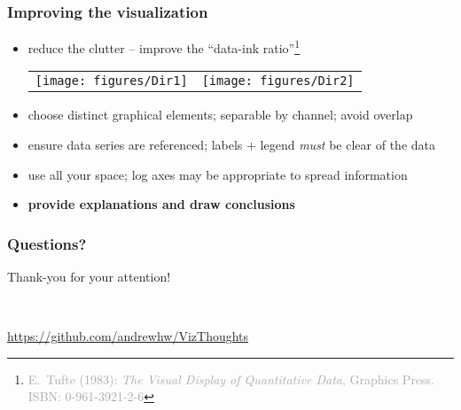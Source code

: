 \documentclass{beamer}
\newcommand{\eg}{\textit{e.g.},\xspace} %
\newcommand{\key}[1]{\textcolor{keyred}{{\bf #1}}}
\begin{document}
\begin{frame}
\frametitle{Improving the visualization}
\begin{itemize}
\item reduce the clutter -- improve the ``data-ink ratio''\footnote{\textcolor{darkgrey}{E.~Tufte (1983): {\it The Visual Display of Quantitative Data}, Graphics Press.\\ ISBN:  0-961-3921-2-6}}
\begin{center}
\begin{tabular}{cc}
\texttt{[image: figures/Dir1]}&
\texttt{[image: figures/Dir2]}
\end{tabular}
\end{center}
\item choose distinct graphical elements; separable by channel; avoid overlap
\item ensure data series are referenced; labels + legend \emph{must} be clear of the data
\item use all your space; log axes may be appropriate to spread information
\item \key{provide explanations and draw conclusions}
\end{itemize}
\end{frame}

\begin{frame}
\frametitle{Questions?}
\begin{center}
{\Huge Thank-you for your attention!}
\vspace{3em}
\end{center}
\begin{center}
{\Huge ~\faSmileO~}
\vspace{3em}

\url{https://github.com/andrewhw/VizThoughts}
\end{center}
\end{frame}

\end{document}
